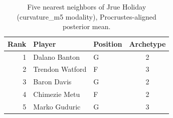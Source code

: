 \begin{table}[htbp]
  \centering\small
  \begin{tabular}{rllc}
    \toprule
    Rank & Player & Position & Archetype \\
    \midrule
    1 & Dalano Banton & G & 2 \\
    2 & Trendon Watford & F & 3 \\
    3 & Baron Davis & G & 2 \\
    4 & Chimezie Metu & F & 2 \\
    5 & Marko Guduric & G & 3 \\
    \bottomrule
  \end{tabular}
  \caption{Five nearest neighbors of Jrue Holiday (curvature_m5 modality), Procrustes-aligned posterior mean.}
  \label{tab:Jrue_Holiday_neighbors_curvature_m5}
\end{table}

